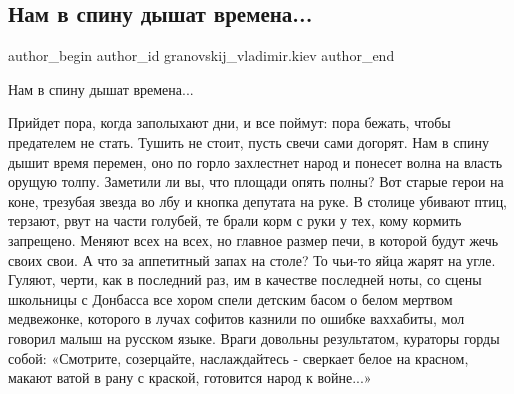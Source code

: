  
 
 
 
 
 
\subsection{Нам в спину дышат времена...}
\label{sec:10_02_2022.fb.granovskij_vladimir.kiev.1.nam_v_spinu_dyshat_vremena}
 
\ifcmt
 author_begin
   author_id granovskij_vladimir.kiev
 author_end
\fi

Нам в спину дышат времена...


Прийдет пора, когда заполыхают дни, и все поймут: пора бежать, чтобы предателем
не стать. Тушить не стоит, пусть свечи сами догорят. Нам в спину дышит время
перемен, оно по горло захлестнет народ и понесет волна на власть орущую толпу.
Заметили ли вы, что площади опять полны?  Вот старые герои на коне, трезубая
звезда во лбу и кнопка депутата на руке. В столице убивают птиц, терзают, рвут
на части голубей, те брали корм с руки у тех, кому кормить запрещено. Меняют
всех на всех, но главное размер печи, в которой будут жечь своих свои. А что за
аппетитный запах на столе? То чьи-то яйца жарят на угле. Гуляют, черти, как в
последний раз, им в качестве последней ноты, со сцены школьницы с Донбасса все
хором спели детским басом о белом мертвом медвежонке, которого в лучах софитов
казнили по ошибке ваххабиты, мол говорил малыш на русском языке. Враги довольны
результатом, кураторы горды собой: «Смотрите, созерцайте, наслаждайтесь -
сверкает белое на красном, макают ватой в рану с краской, готовится народ к
войне...»
